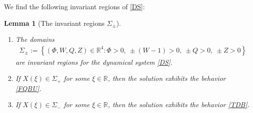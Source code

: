 \documentclass{article}%
\newtheorem{lemma}[theorem]{Lemma}
\newcommand{\R}{\mathbb{R}}
\begin{document}
We find the following invariant regions of \eqref{DS}:
\begin{lemma}[The invariant regions $\Sigma_{\pm}$] \label{lem-invariant} \text{}%
  \begin{enumerate}
  \item The domains
    \begin{align*}
      \Sigma_{\pm} := \left\{ (\Phi, W,Q,Z) \in\R^{4} : \Phi > 0, \ \pm (W-1)> 0,\ \pm Q>0,\ \pm Z>0 \right\}
    \end{align*}
    are invariant regions for the dynamical system \eqref{DS}.
  \item If $X(\xi) \in\Sigma_{+}$ for some $\xi \in\R $, then the solution 
exhibits the behavior \eqref{FQBU}.
  \item If $X(\xi) \in\Sigma_{-}$ for some $\xi \in\R $, then the solution
    exhibits the behavior \eqref{TDB}.
  \end{enumerate}
\end{lemma}
\end{document}
